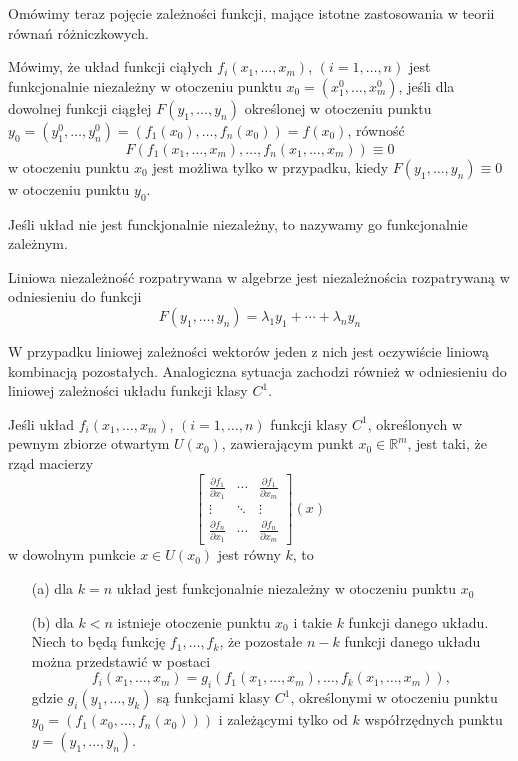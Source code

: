 \documentclass[leqno]{article}
\begin{document}
\begin{justify}
Omówimy teraz pojęcie zależności funkcji, mające istotne zastosowania w teorii równań różniczkowych. 

\begin{defn}
    Mówimy, że układ funkcji ciąłych $f_i(x_1, \ldots, x_m)$, $(i = 1, \ldots, n)$ jest funkcjonalnie niezależny w otoczeniu 
    punktu $x_0 = (x_1^0, \ldots, x_m^0)$, jeśli dla dowolnej funkcji ciągłej $F(y_1, \ldots, y_n)$ określonej w otoczeniu punktu $y_0 = (y_1^0, \ldots, y_n^0) 
    = (f_1(x_0), \ldots, f_n(x_0)) = f(x_0)$, równość 
    \[
        F(f_1(x_1, \ldots, x_m), \ldots, f_n(x_1, \ldots, x_m)) \equiv 0
    \]
    w otoczeniu punktu $x_0$ jest możliwa tylko w przypadku, kiedy $F(y_1, \ldots, y_n) \equiv 0$ w otoczeniu punktu $y_0$.

    Jeśli układ nie jest funckjonalnie niezależny, to nazywamy go funkcjonalnie zależnym.

    Liniowa niezależność rozpatrywana w algebrze jest niezależnościa rozpatrywaną w odniesieniu do funkcji 
    \[
        F(y_1, \ldots, y_n) = \lambda_1 y_1 + \cdots + \lambda_n y_n
    \]
    
    W przypadku liniowej zależności wektorów jeden z nich jest oczywiście liniową kombinacją pozostałych. Analogiczna sytuacja zachodzi również 
    w odniesieniu do liniowej zależności układu funkcji klasy $C^1$.
\end{defn}

\begin{theorem}
    {
        Jeśli układ $f_i(x_1, \ldots, x_m)$, $(i = 1, \ldots, n)$ funkcji klasy $C^1$, określonych w pewnym zbiorze otwartym $U(x_0)$,
        zawierającym punkt $x_0 \in \mathbb{R}^m$, jest taki, że rząd macierzy 
        \[
            \begin{bmatrix}
                \frac{\partial f_1}{\partial x_1} & \cdots & \frac{\partial f_1}{\partial x_m }\\
                \vdots & \ddots & \vdots \\
                \frac{\partial f_n}{\partial x_1} & \cdots & \frac{\partial f_n}{\partial x_m }
            \end{bmatrix}(x)
        \]
        w dowolnym punkcie $x \in U(x_0)$ jest równy $k$, to 
        \begin{itemize}
            \item [(a)] dla $k = n$ układ jest funkcjonalnie niezależny w otoczeniu punktu $x_0$
            \item [(b)] dla $k < n$ istnieje otoczenie punktu $x_0$ i takie $k$ funkcji danego układu.
                Niech to będą funkcję $f_1, \ldots, f_k$, że pozostałe $n-k$ funkcji danego układu można przedstawić w postaci 
                \[
                    f_i(x_1, \ldots, x_m) = g_i(f_1(x_1, \ldots, x_m), \ldots, f_k(x_1, \ldots, x_m)),
                \]
                gdzie $g_i(y_1, \ldots, y_k)$ są funkcjami klasy $C^1$, określonymi w otoczeniu punktu $y_0 = (f_1(x_0, \ldots, f_n(x_0)))$
                i zależącymi tylko od $k$ współrzędnych punktu $y = (y_1, \ldots, y_n)$.
        \end{itemize}
    }
    \end{theorem}
    

\end{justify}
\end{document}
